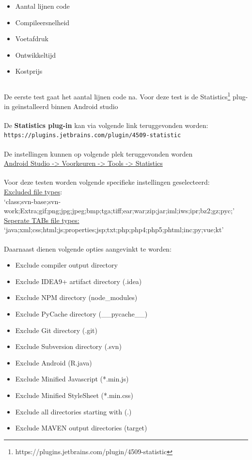 \begin{itemize}
    \item Aantal lijnen code
    \item Compileersnelheid
    \item Voetafdruk
    \item Ontwikkeltijd
    \item Kostprijs
\end{itemize}

\subsection{}
\label{sec:M-test-lijnen-code}
De eerste test gaat het aantal lijnen code na. Voor deze test is de Statistics\footnote{https://plugins.jetbrains.com/plugin/4509-statistic} plug-in geïnstalleerd binnen Android studio
\\ \\
De \textbf{Statistics plug-in} kan via volgende link teruggevonden worden:\\
\verb*|https://plugins.jetbrains.com/plugin/4509-statistic|
\\ \\
De instellingen kunnen op volgende plek teruggevonden worden \\ 
\underline{Android Studio -> Voorkeuren -> Tools -> Statistics}
\\ \\
Voor deze testen worden volgende specifieke instellingen geselecteerd: \\
\underline{Excluded file types}:\\ `class;svn-base;svn-work;Extra;gif;png;jpg;jpeg;bmp;tga;tiff;ear;war;zip;jar;iml;iws;ipr;bz2;gz;pyc;'
\underline{Seperate TABs file types:}\\
`java;xml;css;html;js;properties;jsp;txt;php;php4;php5;phtml;inc;py;vue;kt'
\\ \\
Daarnaast dienen volgende opties aangevinkt te worden:\\
\begin{itemize}
    \item Exclude compiler output directory
    \item Exclude IDEA9+ artifact directory (.idea)
    \item Exclude NPM directory (node\_modules)
    \item Exclude PyCache directory (\_\_pycache\_\_)
    \item Exclude Git directory (.git)
    \item Exclude Subversion directory (.svn)
    \item Exclude Android (R.java)
    \item Exclude Minified Javascript (*.min.js)
    \item Exclude Minified StyleSheet (*.min.css)
    \item Exclude all directories starting with (.)
    \item Exclude MAVEN output directories (target)
\end{itemize}

